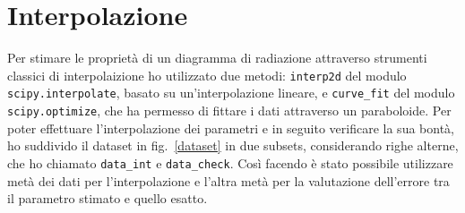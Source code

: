 \documentclass[12pt,a4paper,final]{book}
\begin{document}

\section{Interpolazione}\label{interpolazione}
Per stimare le proprietà di un diagramma di radiazione attraverso strumenti classici di interpolaizione ho utilizzato due metodi: \texttt{interp2d} del modulo \texttt{scipy.interpolate}, basato su un'interpolazione lineare, e \texttt{curve\_fit} del modulo \texttt{scipy.optimize}, che ha permesso di fittare i dati attraverso un paraboloide.
Per poter effettuare l'interpolazione dei parametri e in seguito verificare la sua bontà, ho suddivido il dataset in fig.~\ref{dataset} in due subsets, considerando righe alterne, che ho chiamato \texttt{data\_int} e \texttt{data\_check}. Così facendo è stato possibile utilizzare metà dei dati per l'interpolazione e l'altra metà per la valutazione dell'errore tra il parametro stimato e quello esatto.

\end{document}
